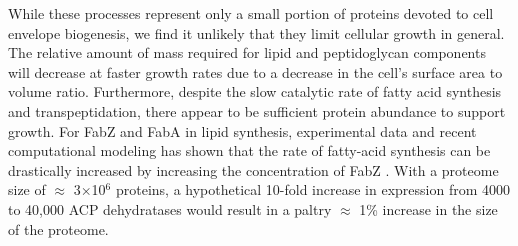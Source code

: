 

While these processes represent only a small portion of
proteins devoted to cell envelope biogenesis, we find it unlikely that they
limit cellular growth in general. The relative amount of mass required for
lipid and peptidoglycan components will decrease at faster growth rates due to a
decrease in the cell's surface area to volume ratio.
Furthermore, despite the slow catalytic rate of fatty acid synthesis and transpeptidation,
there appear to be sufficient protein abundance to support growth.
For FabZ and FabA in lipid
synthesis, experimental data and recent computational modeling has shown that
the rate of fatty-acid synthesis can be drastically increased by increasing
the concentration of FabZ \citep{yu2011, ruppe2018}. With a proteome size of
$\approx$ 3$\times$10$^6$ proteins, a hypothetical 10-fold increase in
expression from 4000 to 40,000 ACP dehydratases would result in a paltry
$\approx$ 1\% increase in the size of the proteome.

